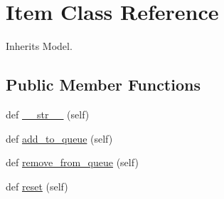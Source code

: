 \hypertarget{classdynamicfilterapp_1_1models_1_1_item}{}\section{Item Class Reference}
\label{classdynamicfilterapp_1_1models_1_1_item}


Inherits Model.

\subsection*{Public Member Functions}
\begin{DoxyCompactItemize}
\item 
def \hyperlink{classdynamicfilterapp_1_1models_1_1_item_a23e8041ce1015febe4fdace3225714f9}{\+\_\+\+\_\+str\+\_\+\+\_\+} (self)
\item 
def \hyperlink{classdynamicfilterapp_1_1models_1_1_item_ac83cd255885b9a7b8852cd66fad6da53}{add\+\_\+to\+\_\+queue} (self)
\item 
def \hyperlink{classdynamicfilterapp_1_1models_1_1_item_a438b59c52d810e87114f98c1996d6272}{remove\+\_\+from\+\_\+queue} (self)
\item 
def \hyperlink{classdynamicfilterapp_1_1models_1_1_item_a51829b63adb24ac48d350dee60181002}{reset} (self)
\end{DoxyCompactItemize}
